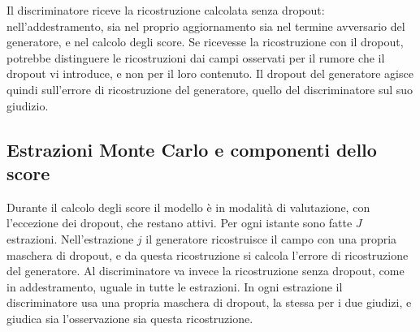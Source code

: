 Il discriminatore riceve la ricostruzione calcolata senza dropout: nell'addestramento, sia nel proprio aggiornamento sia nel termine avversario del generatore, e nel calcolo degli score. Se ricevesse la ricostruzione con il dropout, potrebbe distinguere le ricostruzioni dai campi osservati per il rumore che il dropout vi introduce, e non per il loro contenuto. Il dropout del generatore agisce quindi sull'errore di ricostruzione del generatore, quello del discriminatore sul suo giudizio.

\subsection{Estrazioni Monte Carlo e componenti dello score}

Durante il calcolo degli score il modello è in modalità di valutazione, con l'eccezione dei dropout, che restano attivi. Per ogni istante sono fatte $J$ estrazioni.
Nell'estrazione $j$ il generatore ricostruisce il campo con una propria maschera di dropout, e da questa ricostruzione si calcola l'errore di ricostruzione del generatore. Al discriminatore va invece la ricostruzione senza dropout, come in addestramento, uguale in tutte le estrazioni. In ogni estrazione il discriminatore usa una propria maschera di dropout, la stessa per i due giudizi, e giudica sia l'osservazione sia questa ricostruzione.

